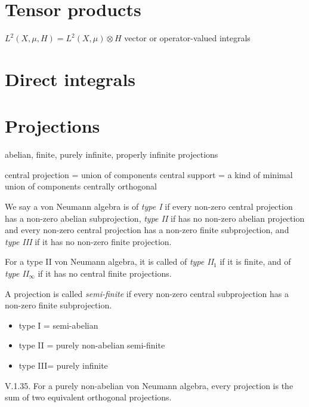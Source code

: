 \documentclass{../../large}
\begin{document}
\section{Tensor products}

$L^2(X,\mu,H)=L^2(X,\mu)\otimes H$
vector or operator-valued integrals


\section{Direct integrals}

\begin{prb}
\end{prb}

\begin{prb}
\end{prb}




\section{Projections}

abelian, finite, purely infinite, properly infinite projections

central projection = union of components
central support = a kind of minimal union of components
centrally orthogonal

\begin{prb}
We say a von Neumann algebra is of \emph{type I} if every non-zero central projection has a non-zero abelian subprojection, \emph{type II} if has no non-zero abelian projection and every non-zero central projection has a non-zero finite subprojection, and \emph{type III} if it has no non-zero finite projection.

For a type II von Neumann algebra, it is called of \emph{type II$_1$} if it is finite, and of \emph{type II$_\infty$} if it has no central finite projections.

A projection is called \emph{semi-finite} if every non-zero central subprojection has a non-zero finite subprojection.
\end{prb}

\begin{itemize}
\item type I = semi-abelian
\item type II = purely non-abelian semi-finite
\item type III= purely infinite
\end{itemize}
V.1.35. For a purely non-abelian von Neumann algebra, every projection is the sum of two equivalent orthogonal projections.
\end{document}
